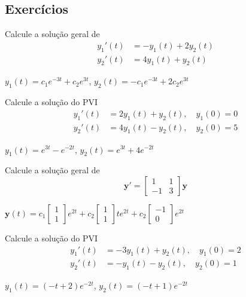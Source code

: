 \subsection*{Exercícios}

\begin{exer}
  Calcule a solução geral de
  \begin{align}
    y_1'(t) &= -y_1(t) + 2y_2(t) \\
    y_2'(t) &= 4y_1(t) + y_2(t)
  \end{align}
\end{exer}
\begin{resp}
  $y_1(t) = c_1e^{-3t} + c_2e^{3t}$, $y_2(t) = -c_1e^{-3t} + 2c_2e^{3t}$
\end{resp}

\begin{exer}
  Calcule a solução do PVI
  \begin{align}
    y_1'(t) &= 2y_1(t) + y_2(t),\quad y_1(0) = 0 \\
    y_2'(t) &= 4y_1(t) - y_2(t),\quad y_2(0) = 5
  \end{align}
\end{exer}
\begin{resp}
  $y_1(t) = e^{3t} - e^{-2t}$, $y_2(t) = e^{3t} + 4e^{-2t}$
\end{resp}

\begin{exer}
  Calcule a solução geral de
  \begin{equation}
    \pmb{y}' =
    \begin{bmatrix}
      1 & 1 \\
      -1 & 3
    \end{bmatrix}\pmb{y}
  \end{equation}
\end{exer}
\begin{resp}
  $\displaystyle \pmb{y}(t) = c_1
  \begin{bmatrix}
    1\\
    1
  \end{bmatrix}e^{2t} + c_2
  \begin{bmatrix}
    1\\
    1
  \end{bmatrix}te^{2t} + c_2
  \begin{bmatrix}
    -1\\
    0
  \end{bmatrix}e^{2t}$
\end{resp}

\begin{exer}
  Calcule a solução do PVI
  \begin{align}
    y_1'(t) &= -3y_1(t) + y_2(t),\quad y_1(0) = 2 \\
    y_2'(t) &= -y_1(t) - y_2(t),\quad y_2(0) = 1
  \end{align}
\end{exer}
\begin{resp}
  $y_1(t) = (-t+2)e^{-2t}$, $y_2(t) = (-t+1)e^{-2t}$
\end{resp}

